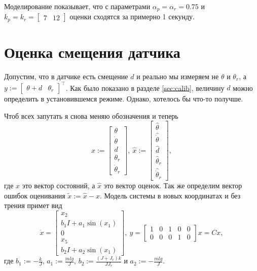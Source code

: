 \documentclass{article}
\begin{document}
Моделирование показывает, что с параметрами $\alpha_p=\alpha_r=0.75$ и $k_p=k_r=\begin{bmatrix} 7 & 12 \end{bmatrix}$ оценки сходятся за примерно 1 секунду.

\section{Оценка смещения датчика}
Допустим, что в датчике есть смещение $d$ и реально мы измеряем не $\theta$ и $\theta_r$, а $y:=\begin{bmatrix} \theta+d & \theta_r \end{bmatrix}^\top$. Как было показано в разделе \ref{sec:calib}, величину $d$ можно определить в установившемся режиме. Однако, хотелось бы что-то получше. 

Чтоб всех запутать я снова меняю обозначения и теперь
\begin{equation} \label{eq:FullState}
	x:=\begin{bmatrix} \theta \\ \dot{\theta} \\ d \\ \theta_r \\\dot{\theta}_r \end{bmatrix}, \ 
	\hat{x}:=\begin{bmatrix} \hat{\theta} \\ \hat{\dot{\theta}} \\ \hat{d} \\ \hat{\theta}_r \\ \hat{\dot{\theta}}_r \end{bmatrix},
\end{equation}
где $x$ это вектор состояний, а $\hat{x}$ это вектор оценок. Так же определим вектор ошибок оценивания $\tilde{x}:=\hat{x}-x$. Модель системы в новых координатах и без трения примет вид
\[
	\dot{x} = \begin{bmatrix} x_2 \\ b_1I +a_1\sin(x_1) \\ 0 \\ x_5 \\ b_2I +a_2\sin(x_1) \end{bmatrix}, \ 
	y=\begin{bmatrix} 1 & 0 & 1 & 0 & 0 \\ 0 & 0 & 0 & 1 & 0 \end{bmatrix}x = Cx,
\]
где $b_1:=-\frac{k}{J}$, $a_1:=\frac{mlg}{J}$, $b_2:=\frac{(J+J_r)k}{JJ_r}$ и $a_2:=- \frac{mlg}{J}$.
\end{document}
